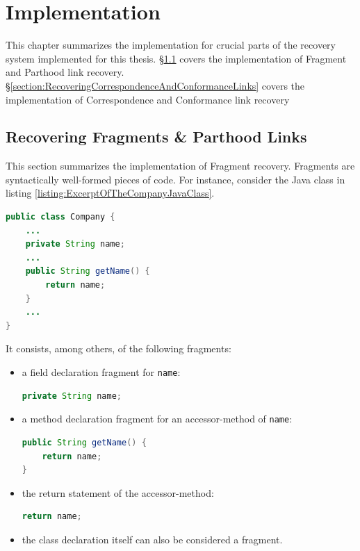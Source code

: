 \chapter{Implementation}
\label{chapter:Implementation}
This chapter summarizes the implementation for crucial parts of the recovery system implemented for this thesis.
§\ref{section:RecoveringFragmentsAnParthoodLinks} covers the implementation of \gls{Fragment} and \gls{Parthood} link recovery.
§\ref{section:RecoveringCorrespondenceAndConformanceLinks} covers the implementation of \gls{Correspondence} and \gls{Conformance} link recovery

\section{Recovering Fragments \& Parthood Links}
\label{section:RecoveringFragmentsAnParthoodLinks}
This section summarizes the implementation of \gls{Fragment} recovery.
\Glspl{Fragment} are syntactically well-formed pieces of code.
For instance, consider the \gls{Java} class in listing \ref{listing:ExcerptOfTheCompanyJavaClass}.
\begin{lstlisting}[language=Java,caption={Excerpt of the Company Java class},label={listing:ExcerptOfTheCompanyJavaClass}]
public class Company {
	...
	private String name;
	...
	public String getName() {
		return name;
	}
	...
}
\end{lstlisting}
It consists, among others, of the following fragments:
\begin{itemize}
\item
a field declaration fragment for \texttt{name}:
\begin{lstlisting}[language=Java,numbers=none,frame=no]
private String name;
\end{lstlisting}
\item
a method declaration fragment for an accessor-method of \texttt{name}:
\begin{lstlisting}[language=Java,numbers=none,frame=no]
public String getName() {
	return name;
}
\end{lstlisting}
\item
the return statement of the accessor-method:
\begin{lstlisting}[language=Java,numbers=none,frame=no]
return name;
\end{lstlisting}
\item
the class declaration itself can also be considered a fragment.
\end{itemize}

